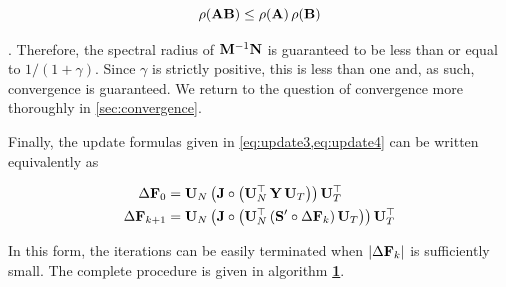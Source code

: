 \begin{equation}
    \label{eq:psd}
    \rho(\mathbf{A}\mathbf{B}) \leq \rho(\mathbf{A}) \, \rho(\mathbf{B})
\end{equation}

\citep{Bhatia1997}. Therefore, the spectral radius of $\mathbf{M}^{-1}\mathbf{N}$ is guaranteed to be less than or equal to $1 / (1 + \gamma)$.  Since $\gamma$ is strictly positive, this is less than one and, as such, convergence is guaranteed. We return to the question of convergence more thoroughly in \cref{sec:convergence}. 

Finally, the update formulas given in \cref{eq:update3,eq:update4} can be written equivalently as 

\begin{align}
    \Delta \mathbf{F}_0     & = \mathbf{U}_N \, \big( \mathbf{J}  \circ \big( \mathbf{U}_N^\top \, \mathbf{Y} \, \mathbf{U}_T \big) \big) \, \mathbf{U}_T^\top  \\
    \Delta \mathbf{F}_{k+1} & = \mathbf{U}_N \, \big( \mathbf{J}  \circ \big( \mathbf{U}_N^\top \, (\mathbf{S}' \circ \Delta \mathbf{F}_{k})\, \mathbf{U}_T \big) \big) \, \mathbf{U}_T^\top
\end{align}

In this form, the iterations can be easily terminated when $|\Delta \mathbf{F}_{k}|$ is sufficiently small. The complete procedure is given in algorithm \hyperlink{al:SIM}{\textbf{1}}.

